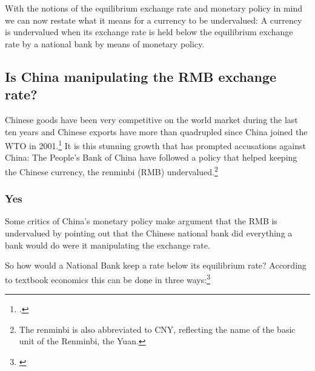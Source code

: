 
With the notions of the equilibrium exchange rate and monetary policy in mind we can now restate what it means for a currency to be undervalued: A currency is undervalued when its exchange rate is held below the equilibrium exchange rate by a national bank by means of monetary policy.

\subsection{Is China manipulating the RMB exchange rate?}

Chinese goods have been very competitive on the world market during the 
last ten years and Chinese exports have more than quadrupled since China 
joined the WTO in 2001.\footnote{\cite{FRED2012}.} It is this stunning 
growth that has prompted accusations against China: The People's Bank of 
China have followed a policy that helped keeping the Chinese currency, 
the renminbi (RMB) undervalued.\footnote{The renminbi is also 
abbreviated to CNY, reflecting the name of  the basic unit of the 
Renminbi, the Yuan.}

\subsubsection{Yes}

Some critics of China's monetary policy make argument that the RMB is 
undervalued by pointing out that the Chinese national bank did 
everything a bank would do were it manipulating the exchange rate. 

So how would a National Bank keep a rate below its equilibrium rate? According to 
textbook economics this can be done in three ways:\footnote{\cite[pp. 
514]{Krugman2008}}

